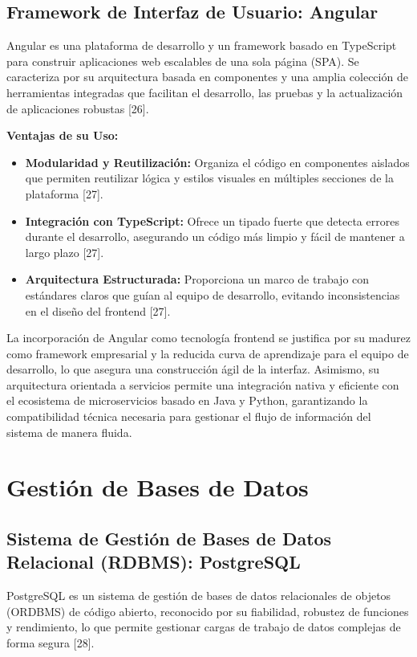 \subsection{Framework de Interfaz de Usuario: Angular}
Angular es una plataforma de desarrollo y un framework basado en TypeScript para construir aplicaciones web escalables de una sola página (SPA). Se caracteriza por su arquitectura basada en componentes y una amplia colección de herramientas integradas que facilitan el desarrollo, las pruebas y la actualización de aplicaciones robustas [26].

\textbf{Ventajas de su Uso:}
\begin{itemize}
    \item \textbf{Modularidad y Reutilización:} Organiza el código en componentes aislados que permiten reutilizar lógica y estilos visuales en múltiples secciones de la plataforma [27].
    \item \textbf{Integración con TypeScript:} Ofrece un tipado fuerte que detecta errores durante el desarrollo, asegurando un código más limpio y fácil de mantener a largo plazo [27].
    \item \textbf{Arquitectura Estructurada:} Proporciona un marco de trabajo con estándares claros que guían al equipo de desarrollo, evitando inconsistencias en el diseño del frontend [27].
\end{itemize}

La incorporación de Angular como tecnología frontend se justifica por su madurez como framework empresarial y la reducida curva de aprendizaje para el equipo de desarrollo, lo que asegura una construcción ágil de la interfaz. Asimismo, su arquitectura orientada a servicios permite una integración nativa y eficiente con el ecosistema de microservicios basado en Java y Python, garantizando la compatibilidad técnica necesaria para gestionar el flujo de información del sistema de manera fluida.

\section{Gestión de Bases de Datos}
\subsection{Sistema de Gestión de Bases de Datos Relacional (RDBMS): PostgreSQL}
PostgreSQL es un sistema de gestión de bases de datos relacionales de objetos (ORDBMS) de código abierto, reconocido por su fiabilidad, robustez de funciones y rendimiento, lo que permite gestionar cargas de trabajo de datos complejas de forma segura [28].

